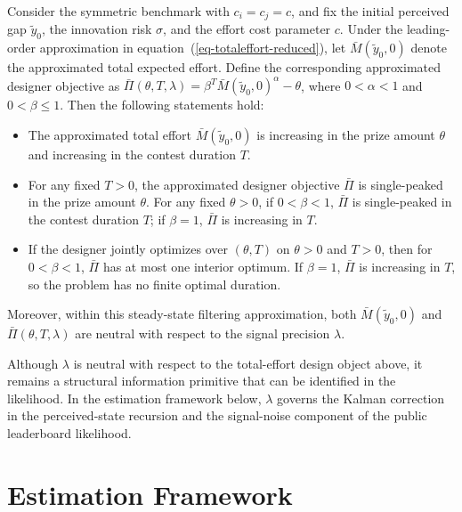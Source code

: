 \documentclass[mnsc]{informs3}
\begin{document}
\begin{proposition}\label{prop-monotonicity-M}
Consider the symmetric benchmark with $c_i=c_j=c$, and fix the initial perceived gap $\tilde y_0$, the innovation risk $\sigma$, and the effort cost parameter $c$.
Under the leading-order approximation in equation~(\ref{eq-totaleffort-reduced}), let $\bar M(\tilde y_0,0)$ denote the approximated total expected effort.
Define the corresponding approximated designer objective as $\bar\Pi(\theta,T,\lambda)=\beta^T \bar M(\tilde y_0,0)^\alpha-\theta$, where $0<\alpha<1$ and $0<\beta\leq 1$.
Then the following statements hold:
\begin{itemize}
	\item [(1)] The approximated total effort $\bar{M}(\tilde y_0,0)$ is increasing in the prize amount $\theta$ and increasing in the contest duration $T$.

	\item [(2)] For any fixed $T>0$, the approximated designer objective $\bar\Pi$ is single-peaked in the prize amount $\theta$. For any fixed $\theta>0$, if $0<\beta<1$, $\bar\Pi$ is single-peaked in the contest duration $T$; if $\beta=1$, $\bar\Pi$ is increasing in $T$.

    \item[(3)] If the designer jointly optimizes over $(\theta,T)$ on $\theta>0$ and $T>0$, then for $0<\beta<1$, $\bar\Pi$ has at most one interior optimum. If $\beta=1$, $\bar\Pi$ is increasing in $T$, so the problem has no finite optimal duration.
\end{itemize}
Moreover, within this steady-state filtering approximation, both $\bar M(\tilde y_0,0)$ and $\bar\Pi(\theta,T,\lambda)$ are neutral with respect to the signal precision $\lambda$.
\end{proposition}

Although $\lambda$ is neutral with respect to the total-effort design object above, it remains a structural information primitive that can be identified in the likelihood.
In the estimation framework below, $\lambda$ governs the Kalman correction in the perceived-state recursion and the signal-noise component of the public leaderboard likelihood.






\section{Estimation Framework}\label{sect-bayes-framework}
\end{document}
